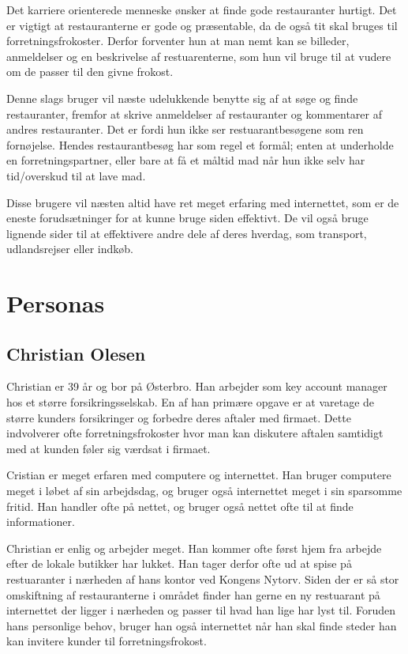 \documentclass[a4paper, 12pt]{article}
\begin{document}
Det karriere orienterede menneske ønsker at finde gode restauranter hurtigt. Det er vigtigt at restauranterne er gode og præsentable, da de også tit skal bruges til forretningsfrokoster. Derfor forventer hun at man nemt kan se billeder, anmeldelser og en beskrivelse af restuarenterne, som hun vil bruge til at vudere om de passer til den givne frokost. 

Denne slags bruger vil næste udelukkende benytte sig af at søge og finde restauranter, fremfor at skrive anmeldelser af restauranter og kommentarer af andres restauranter. Det er fordi hun ikke ser restuarantbesøgene som ren fornøjelse. Hendes restaurantbesøg har som regel et formål; enten at underholde en forretningspartner, eller bare at få et måltid mad når hun ikke selv har tid/overskud til at lave mad. 

Disse brugere vil næsten altid have ret meget erfaring med internettet, som er de eneste forudsætninger for at kunne bruge siden effektivt. De vil også bruge lignende sider til at effektivere andre dele af deres hverdag, som transport, udlandsrejser eller indkøb.

\section{Personas}
\label{sec:Personas}

\subsection{Christian Olesen}
Christian er 39 år og bor på Østerbro. Han arbejder som key account manager hos et større forsikringsselskab. En af han primære opgave er at varetage de større kunders forsikringer og forbedre deres aftaler med firmaet. Dette indvolverer ofte forretningsfrokoster hvor man kan diskutere aftalen samtidigt med at kunden føler sig værdsat i firmaet.

Cristian er meget erfaren med computere og internettet. Han bruger computere meget i løbet af sin arbejdsdag, og bruger også internettet meget i sin sparsomme fritid. Han handler ofte på nettet, og bruger også nettet ofte til at finde informationer. 

Christian er enlig og arbejder meget. Han kommer ofte først hjem fra arbejde efter de lokale butikker har lukket. Han tager derfor ofte ud at spise på restuaranter i nærheden af hans kontor ved Kongens Nytorv. Siden der er så stor omskiftning af restauranterne i området finder han gerne en ny restuarant på internettet der ligger i nærheden og passer til hvad han lige har lyst til. Foruden hans personlige behov, bruger han også internettet når han skal finde steder han kan invitere kunder til forretningsfrokost. 
\end{document}
